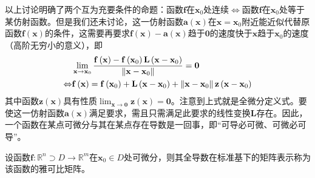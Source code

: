 \documentclass[main.tex]{subfiles}
\begin{document}
以上讨论明确了两个互为充要条件的命题：函数$\mathbf{f}$在$\mathbf{x}_0$处连续$\Leftrightarrow$函数$\mathbf{f}$在$\mathbf{x}_0$处等于某仿射函数。但是我们还未讨论，这一仿射函数$\mathbf{a}\left(\mathbf{x}\right)$在$\mathbf{x}=\mathbf{x}_0$附近能近似代替原函数$\mathbf{f}\left(\mathbf{x}\right)$的条件，这需要再要求$\mathbf{f}\left(\mathbf{x}\right)-\mathbf{a}\left(\mathbf{x}\right)$趋于$\mathbf{0}$的速度快于$\mathbf{x}$趋于$\mathbf{x}_0$的速度（高阶无穷小的意义），即
\begin{align*}
&\lim_{\mathbf{x}\to\mathbf{x}_0}\frac{\mathbf{f}\left(\mathbf{x}\right)-\mathbf{f}\left(\mathbf{x}_0\right)\-\mathbf{L}\left(\mathbf{x}-\mathbf{x}_0\right)}{\left\|\mathbf{x}-\mathbf{x}_0\right\|}=\mathbf{0}\\
\Leftrightarrow&\mathbf{f}\left(\mathbf{x}\right)=\mathbf{f}\left(\mathbf{x}_0\right)+\mathbf{L}\left(\mathbf{x}-\mathbf{x}_0\right)+\left\|\mathbf{x}-\mathbf{x}_0\right\|\mathbf{z}\left(\mathbf{x}-\mathbf{x}_0\right)
\end{align*}
其中函数$\mathbf{z}\left(\mathbf{x}\right)$具有性质$\lim_{\mathbf{x}\to\mathbf{0}}\mathbf{z}\left(\mathbf{x}\right)=\mathbf{0}$。注意到上式就是全微分定义式。要使这一仿射函数$\mathbf{a}\left(\mathbf{x}\right)$满足要求，需且只需满足此要求的线性变换$\mathbf{L}$存在。因此，一个函数在某点可微分与其在某点存在导数是一回事，即“可导必可微、可微必可导”。

\begin{definition}[雅可比矩阵]
设函数$\mathbf{f}:\mathbb{R}^n\supset D\rightarrow\mathbb{R}^m$在$\mathbf{x}_0\in D$处可微分，则其全导数在标准基下的矩阵表示称为该函数的雅可比矩阵。
\end{definition}
\end{document}
